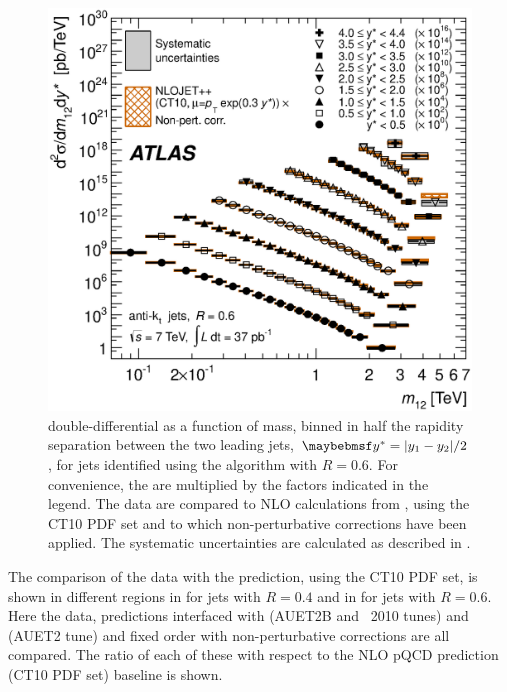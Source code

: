 \begin{figure}
  \includegraphics[width=\largefigwidth]{chapters/dijets/DijetMassYStarNLO_06.eps}
  \caption{\Dijet double-differential \xs as a function of \dijet mass, binned
     in half the rapidity separation between the two leading jets, $\yStar = |y_1 - y_2|/2$,
     for jets identified using the \akt algorithm with $R=0.6$. For convenience,
     the  are multiplied by the factors indicated in the legend. The
     data are compared to NLO \pQCD calculations from \NLOjetpp, using the CT10
     PDF set and to which non-perturbative corrections have been applied. The systematic
     uncertainties are calculated as described in .}
  \label{fig:dijets:InclusiveCrossSectionAKT6}
\end{figure}

The comparison of the data with the \Powheg prediction, using the CT10 PDF set,
is shown in different \yStar regions in 
for \akt jets with $R=0.4$ and in 
for \akt jets with $R=0.6$. Here the data, \Powheg predictions interfaced with
\Pythia (AUET2B and \Perugia~2010 tunes) and \Herwig (AUET2 tune) and fixed order
\Powheg with non-perturbative corrections are all compared. The ratio of each of
these with respect to the NLO pQCD prediction (CT10 PDF set) baseline is shown.

